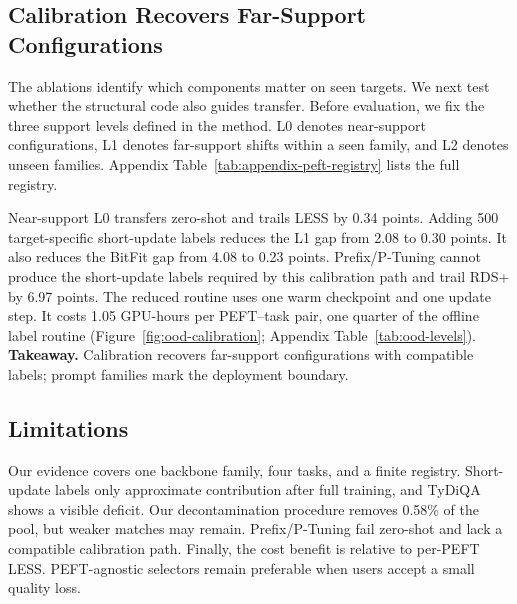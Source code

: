 \subsection{Calibration Recovers Far-Support Configurations}

The ablations identify which components matter on seen targets. We next test whether the structural code also guides transfer. Before evaluation, we fix the three support levels defined in the method. L0 denotes near-support configurations, L1 denotes far-support shifts within a seen family, and L2 denotes unseen families. Appendix Table~\ref{tab:appendix-peft-registry} lists the full registry.

Near-support L0 transfers zero-shot and trails LESS by 0.34 points. Adding 500 target-specific short-update labels reduces the L1 gap from 2.08 to 0.30 points. It also reduces the BitFit gap from 4.08 to 0.23 points. Prefix/P-Tuning cannot produce the short-update labels required by this calibration path and trail RDS+ by 6.97 points. The reduced routine uses one warm checkpoint and one update step. It costs 1.05 GPU-hours per PEFT--task pair, one quarter of the offline label routine (Figure~\ref{fig:ood-calibration}; Appendix Table~\ref{tab:ood-levels}). \textbf{Takeaway.} Calibration recovers far-support configurations with compatible labels; prompt families mark the deployment boundary.

\subsection{Limitations}

Our evidence covers one backbone family, four tasks, and a finite registry. Short-update labels only approximate contribution after full training, and TyDiQA shows a visible deficit. Our decontamination procedure removes 0.58\% of the pool, but weaker matches may remain. Prefix/P-Tuning fail zero-shot and lack a compatible calibration path. Finally, the cost benefit is relative to per-PEFT LESS. PEFT-agnostic selectors remain preferable when users accept a small quality loss.
